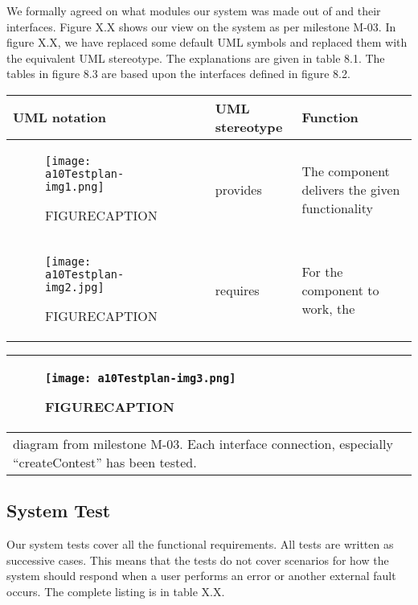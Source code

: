 We formally agreed on what modules our system was made out of and their
interfaces. Figure X.X shows our view on the system as per milestone
M-03. In figure X.X, we have replaced some default UML symbols and
replaced them with the equivalent UML stereotype. The explanations are
given in table 8.1. The tables in figure 8.3 are based upon the
interfaces defined in figure 8.2. 

\begin{tabular}{|m{1.1087599in}|m{1.1712599in}|m{3.3483598in}|}
\hline
UML notation &
UML stereotype &
Function\\\hline
\begin{figure}[h!]
	\texttt{[image: a10Testplan-img1.png]}
	\caption{FIGURECAPTION}
\end{figure}
 &
provides &
\sffamily\color{black} The component delivers the given functionality
\\\hline
\begin{figure}[h!]
	\texttt{[image: a10Testplan-img2.jpg]}
	\caption{FIGURECAPTION}
\end{figure}
&
requires&
For the component to work, the \\\hline
\end{tabular}

\begin{tabular}{|m{6.42126in}|}
\hline
\begin{figure}[h!]
	\texttt{[image: a10Testplan-img3.png]}
	\caption{FIGURECAPTION}
\end{figure}
\\\hline
diagram from milestone M-03. Each interface connection, especially
``createContest'' has been
tested.\\\hline
\end{tabular}

\subsection{System Test}
Our system tests cover all the functional requirements. All tests are
written as successive cases. This means that the tests do not cover
scenarios for how the system should respond when a user performs an
error or another external fault occurs. The complete listing is in
table X.X.


